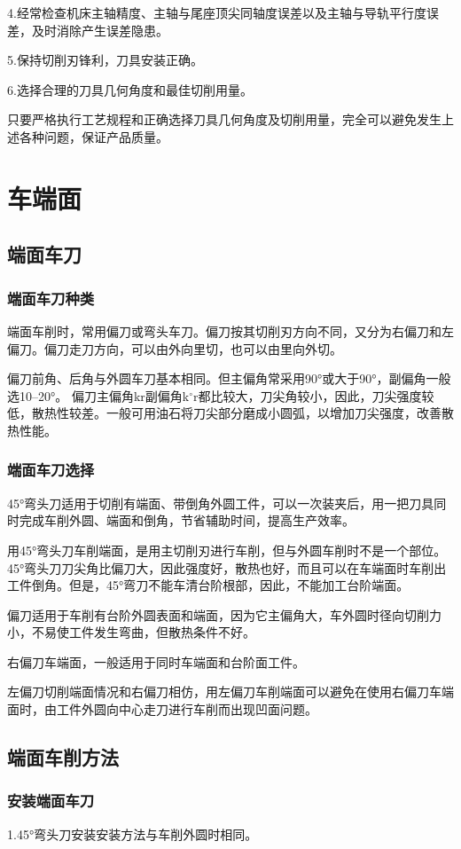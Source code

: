 \documentclass{ctexbook}
\begin{document}
4.经常检查机床主轴精度、主轴与尾座顶尖同轴度误差以及主轴与导轨平行度误差，及时消除产生误差隐患。

5.保持切削刃锋利，刀具安装正确。

6.选择合理的刀具几何角度和最佳切削用量。

只要严格执行工艺规程和正确选择刀具几何角度及切削用量，完全可以避免发生上述各种问题，保证产品质量。
\section{车端面}
\subsection{端面车刀}
\subsubsection{端面车刀种类}
端面车削时，常用偏刀或弯头车刀。偏刀按其切削刃方向不同，又分为右偏刀和左偏刀。偏刀走刀方向，可以由外向里切，也可以由里向外切。

偏刀前角、后角与外圆车刀基本相同。但主偏角常采用90°或大于90°，副偏角一般选10--20°。
偏刀主偏角kr副偏角k$^{\circ}$r都比较大，刀尖角较小，因此，刀尖强度较低，散热性较差。一般可用油石将刀尖部分磨成小圆弧，以增加刀尖强度，改善散热性能。
\subsubsection{端面车刀选择}
45°弯头刀适用于切削有端面、带倒角外圆工件，可以一次装夹后，用一把刀具同时完成车削外圆、端面和倒角，节省辅助时间，提高生产效率。

用45°弯头刀车削端面，是用主切削刃进行车削，但与外圆车削时不是一个部位。45°弯头刀刀尖角比偏刀大，因此强度好，散热也好，而且可以在车端面时车削出工件倒角。但是，45°弯刀不能车清台阶根部，因此，不能加工台阶端面。

偏刀适用于车削有台阶外圆表面和端面，因为它主偏角大，车外圆时径向切削力小，不易使工件发生弯曲，但散热条件不好。

右偏刀车端面，一般适用于同时车端面和台阶面工件。

左偏刀切削端面情况和右偏刀相仿，用左偏刀车削端面可以避免在使用右偏刀车端面时，由工件外圆向中心走刀进行车削而出现凹面问题。
\subsection{端面车削方法}
\subsubsection{安装端面车刀}
1.45°弯头刀安装安装方法与车削外圆时相同。
\end{document}
